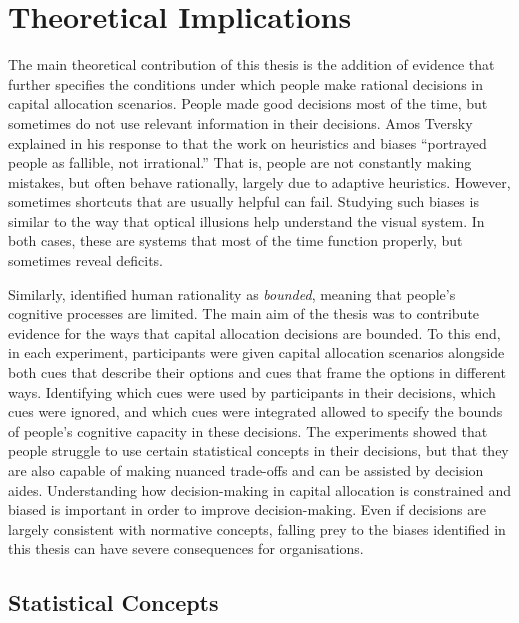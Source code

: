 \documentclass[a4paper, nobind]{templates/ociamthesis}
\theoremstyle{definition}
\theoremstyle{definition}
\theoremstyle{definition}
\theoremstyle{definition}
\theoremstyle{remark}
\begin{document}
\hypertarget{theoretical-implications}{%
\section{Theoretical Implications}\label{theoretical-implications}}

The main theoretical contribution of this thesis is the addition of evidence
that further specifies the conditions under which people make rational decisions
in capital allocation scenarios. People made good decisions most of the time,
but sometimes do not use relevant information in their decisions. Amos Tversky
explained in his response to \textcite[p.~355]{cohen1981} that the work on heuristics and
biases ``portrayed people as fallible, not irrational.'' That is, people are not
constantly making mistakes, but often behave rationally, largely due to adaptive
heuristics. However, sometimes shortcuts that are usually helpful can fail.
Studying such biases is similar to the way that optical illusions help
understand the visual system. In both cases, these are systems that most of the
time function properly, but sometimes reveal deficits.

Similarly, \textcite{simon1955} identified human rationality as \emph{bounded}, meaning that
people's cognitive processes are limited. The main aim of the thesis was to
contribute evidence for the ways that capital allocation decisions are bounded.
To this end, in each experiment, participants were given capital allocation
scenarios alongside both cues that describe their options and cues that frame
the options in different ways. Identifying which cues were used by participants
in their decisions, which cues were ignored, and which cues were integrated
allowed to specify the bounds of people's cognitive capacity in these decisions.
The experiments showed that people struggle to use certain statistical concepts
in their decisions, but that they are also capable of making nuanced trade-offs
and can be assisted by decision aides. Understanding how decision-making in
capital allocation is constrained and biased is important in order to improve
decision-making. Even if decisions are largely consistent with normative
concepts, falling prey to the biases identified in this thesis can have severe
consequences for organisations.

\subsection{Statistical Concepts}
\end{document}

